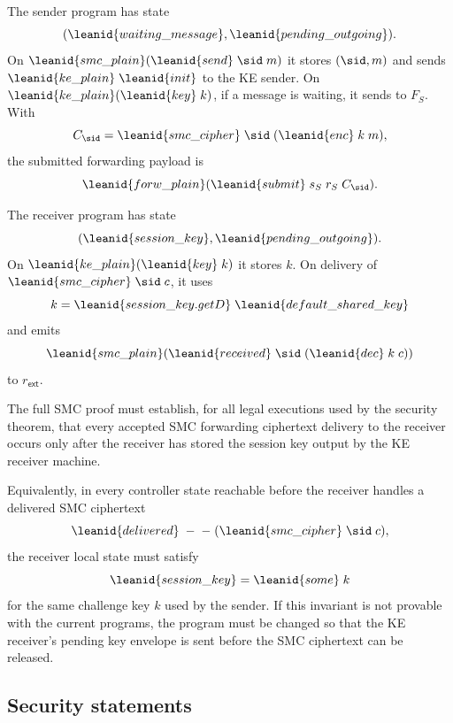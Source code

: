 \begin{definition}
The sender program has state
\[
  (\leanid{waiting\_message},\leanid{pending\_outgoing}).
\]
On \(\leanid{smc\_plain}(\leanid{send}\;\sid\;m)\) it stores
\((\sid,m)\) and sends \(\leanid{ke\_plain}\;\leanid{init}\) to the KE sender.
On \(\leanid{ke\_plain}(\leanid{key}\;k)\), if a message is waiting, it sends to
\(F_S\).  With
\[
  C_{\sid}=\leanid{smc\_cipher}\;\sid\;(\leanid{enc}\;k\;m),
\]
the submitted forwarding payload is
\[
  \leanid{forw\_plain}
    (\leanid{submit}\;s_S\;r_S\;C_{\sid}).
\]

The receiver program has state
\[
  (\leanid{session\_key},\leanid{pending\_outgoing}).
\]
On \(\leanid{ke\_plain}(\leanid{key}\;k)\) it stores \(k\).  On delivery of
\(\leanid{smc\_cipher}\;\sid\;c\), it uses
\[
  k=\leanid{session\_key.getD}\;\leanid{default\_shared\_key}
\]
and emits
\[
  \leanid{smc\_plain}(\leanid{received}\;\sid\;(\leanid{dec}\;k\;c))
\]
to \(r_{\mathsf{ext}}\).
\end{definition}

\begin{obligation}
The full SMC proof must establish, for all legal executions used by the
security theorem, that every accepted SMC forwarding ciphertext delivery to the
receiver occurs only after the receiver has stored the session key output by the
KE receiver machine.

Equivalently, in every controller state reachable before the receiver handles
a delivered SMC ciphertext
\[
  \leanid{delivered}\;-\;-\;(\leanid{smc\_cipher}\;\sid\;c),
\]
the receiver local state must satisfy
\[
  \leanid{session\_key}=\leanid{some}\;k
\]
for the same challenge key \(k\) used by the sender.  If this invariant is not
provable with the current programs, the program must be changed so that the KE
receiver's pending key envelope is sent before the SMC ciphertext can be
released.
\end{obligation}

\subsection{Security statements}

